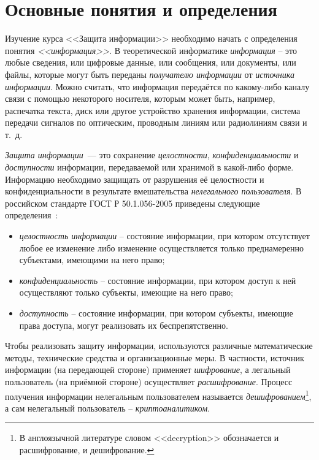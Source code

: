 \chapter{Основные понятия и определения}

Изучение курса <<Защита информации>> необходимо начать с определения понятия \emph{<<информация>>}. В теоретической информатике \emph{информация} -- это любые сведения, или цифровые данные, или сообщения, или документы, или файлы, которые могут быть переданы \emph{получателю информации} от \emph{источника информации}. Можно считать, что информация передаётся по какому-либо каналу связи с помощью некоторого носителя, которым может быть, например, распечатка текста, диск или другое устройство хранения информации, система передачи сигналов по оптическим, проводным линиям или радиолиниям связи и т.~д.

\emph{Защита информации}~--- это сохранение \emph{целостности}, \emph{конфиденциальности} и \emph{доступности} информации, передаваемой или хранимой в какой-либо форме. Информацию необходимо защищать от разрушения её целостности и конфиденциальности в результате вмешательства \emph{нелегального пользователя}. В российском стандарте ГОСТ Р 50.1.056-2005 приведены следующие определения~\cite{GOST-2005}:
\begin{itemize}
	\item \emph{целостность информации} -- состояние информации, при котором отсутствует любое ее изменение либо изменение осуществляется только преднамеренно субъектами, имеющими на него право;
	\item \emph{конфиденциальность} -- состояние информации, при котором доступ к ней осуществляют только субъекты, имеющие на него право;
	\item \emph{доступность} -- состояние информации, при котором субъекты, имеющие права доступа, могут реализовать их беспрепятственно.
\end{itemize}

Чтобы реализовать защиту информации, используются различные математические методы, технические средства и организационные меры. В частности, источник информации (на передающей стороне) применяет \emph{шифрование}, а легальный пользователь (на приёмной стороне) осуществляет \emph{расшифрование}. Процесс получения информации нелегальным пользователем называется \emph{дешифрованием}\footnote{В англоязычной литературе словом <<decryption>> обозначается и расшифрование, и дешифрование.}, а сам нелегальный пользователь -- \emph{криптоаналитиком}.

